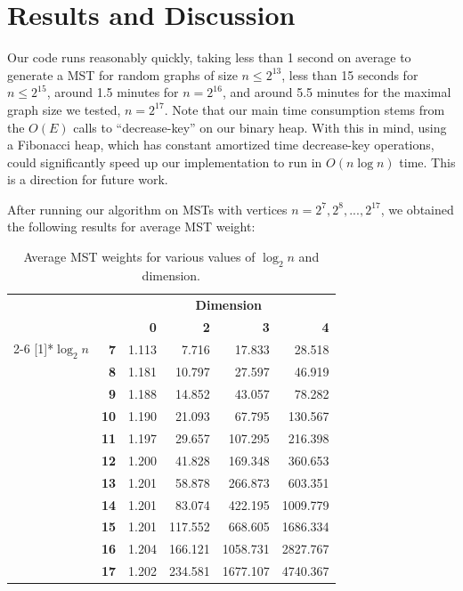 \documentclass[a4paper]{article}
\begin{document}
\section{Results and Discussion}
Our code runs reasonably quickly, taking less than 1 second on average to generate a MST for random graphs of size $n\leq2^{13}$, less than 15 seconds for $n\leq 2^{15}$, around 1.5 minutes for $n=2^{16}$, and around 5.5 minutes for the maximal graph size we tested, $n=2^{17}$. Note that our main time consumption stems from the $O(E)$ calls to ``decrease-key'' on our binary heap. With this in mind, using a Fibonacci heap, which has constant amortized time decrease-key operations, could significantly speed up our implementation to run in $O(n\log n)$ time. This is a direction for future work.

\newpage
After running our algorithm on MSTs with vertices $n=2^7, 2^8, ..., 2^{17}$, we obtained the following results for average MST weight:

\begin{table}[htbp]
  \centering
    \begin{tabular}{cr|rrrr}
          & \multicolumn{1}{r}{} & \multicolumn{4}{c}{\textbf{Dimension}} \\
          &       & \textbf{0} & \textbf{2} & \textbf{3} & \textbf{4} \\
\cmidrule{2-6}    \multirow{11}[1]{*}{\textbf{$\log_2n$}} & \textbf{7} & 1.113 & 7.716 & 17.833 & 28.518 \\
          & \textbf{8} & 1.181 & 10.797 & 27.597 & 46.919 \\
          & \textbf{9} & 1.188 & 14.852 & 43.057 & 78.282 \\
          & \textbf{10} & 1.190 & 21.093 & 67.795 & 130.567 \\
          & \textbf{11} & 1.197 & 29.657 & 107.295 & 216.398 \\
          & \textbf{12} & 1.200 & 41.828 & 169.348 & 360.653 \\
          & \textbf{13} & 1.201 & 58.878 & 266.873 & 603.351 \\
          & \textbf{14} & 1.201 & 83.074 & 422.195 & 1009.779 \\
          & \textbf{15} & 1.201 & 117.552 & 668.605 & 1686.334 \\
          & \textbf{16} & 1.204 & 166.121 & 1058.731 & 2827.767 \\
          & \textbf{17} & 1.202 & 234.581 & 1677.107 & 4740.367 \\
    \end{tabular}%
  \caption{Average MST weights for various values of $\log_2n$ and dimension.}
  \label{tab:addlabel}%
\end{table}%
\end{document}
